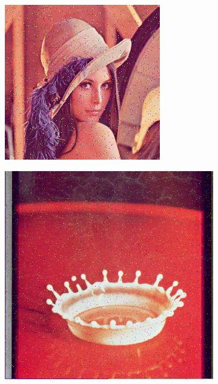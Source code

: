 \begin{subfigure}{0.9\textwidth}
   \centering
\begin{subfigure}[t]{0.15\textwidth}
    \includegraphics[width=0.9\linewidth]{../images/outputs/denoise/before/before0.png}
    
    \centering
  \end{subfigure}
\begin{subfigure}[t]{0.15\textwidth}
    \includegraphics[width=0.9\linewidth]{../images/outputs/denoise/before/before1.png}
    

\end{subfigure}
\end{subfigure}
